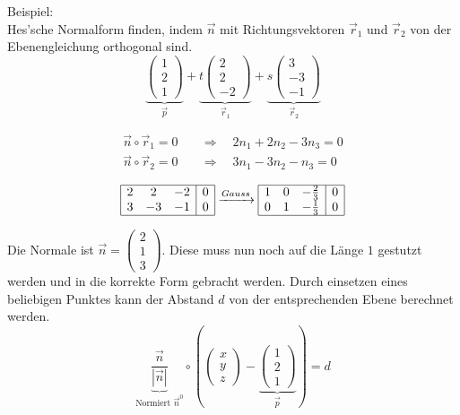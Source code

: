 \noindent Beispiel: \\
Hes'sche Normalform finden, indem $\vec{n}$ mit Richtungsvektoren $\vec{r}_1$ und $\vec{r}_2$ von der Ebenengleichung orthogonal sind.
\[
\underbrace{\begin{pmatrix}1 \\ 2 \\ 1 \end{pmatrix}}_{\vec{p}} + \underbrace{t \begin{pmatrix}2 \\ 2 \\ -2 \end{pmatrix}}_{\vec{r}_1} + \underbrace{s \begin{pmatrix}3 \\ -3 \\ -1 \end{pmatrix}}_{\vec{r}_2}
\]

\begin{align*}
	\vec{n} \circ \vec{r}_1 = 0 \quad &\Rightarrow \quad 2n_1 + 2n_2 - 3n_3 = 0 \\
	\vec{n} \circ \vec{r}_2 = 0 \quad &\Rightarrow \quad 3n_1 - 3n_2 - n_3 = 0
\end{align*}

\[
\begin{array}{|ccc|c|}
	\hline
	2 & 2 & -2 & 0 \\
	3 & -3 & -1 & 0 \\
	\hline
\end{array} \xrightarrow{Gauss}
\begin{array}{|ccc|c|}
	\hline
	1 & 0 & -\frac{2}{3} & 0 \\
	0 & 1 & -\frac{1}{3} & 0 \\
	\hline
\end{array} 
\]

\noindent Die Normale ist $\vec{n} = \begin{pmatrix} 2 \\ 1 \\ 3 \end{pmatrix}$. 
Diese muss nun noch auf die Länge $1$ gestutzt werden und in die korrekte Form gebracht werden.  Durch einsetzen eines beliebigen Punktes kann der Abstand $d$ von der entsprechenden Ebene berechnet werden.
\[
\underbrace{\frac{\vec{n}}{\left|\vec{n}\right|}}_{\text{Normiert } \vec{n}^0}  \circ \left(\begin{pmatrix} x \\ y \\ z \end{pmatrix} - \underbrace{\begin{pmatrix} 1 \\ 2 \\ 1 \end{pmatrix}}_{\vec{p}} \right) = d
\]


